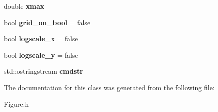 \begin{DoxyCompactItemize}
\item 
\hypertarget{classkeycpp_1_1_plots_a4d7f34173d13de92014702ffba6fb1d4}{double {\bfseries xmax}}\label{classkeycpp_1_1_plots_a4d7f34173d13de92014702ffba6fb1d4}

\item 
\hypertarget{classkeycpp_1_1_plots_abd0c4449bcd999429a3073e2885708d8}{bool {\bfseries grid\-\_\-on\-\_\-bool} = false}\label{classkeycpp_1_1_plots_abd0c4449bcd999429a3073e2885708d8}

\item 
\hypertarget{classkeycpp_1_1_plots_aa994c8e9f09633b26410ed27ea70a1a1}{bool {\bfseries logscale\-\_\-x} = false}\label{classkeycpp_1_1_plots_aa994c8e9f09633b26410ed27ea70a1a1}

\item 
\hypertarget{classkeycpp_1_1_plots_a605e7e4681e977f5d1d2ff95d72946cb}{bool {\bfseries logscale\-\_\-y} = false}\label{classkeycpp_1_1_plots_a605e7e4681e977f5d1d2ff95d72946cb}

\item 
\hypertarget{classkeycpp_1_1_plots_a0ed0add050a618468cbf2cffe2529bad}{std\-::ostringstream {\bfseries cmdstr}}\label{classkeycpp_1_1_plots_a0ed0add050a618468cbf2cffe2529bad}

\end{DoxyCompactItemize}


The documentation for this class was generated from the following file\-:\begin{DoxyCompactItemize}
\item 
Figure.\-h\end{DoxyCompactItemize}
